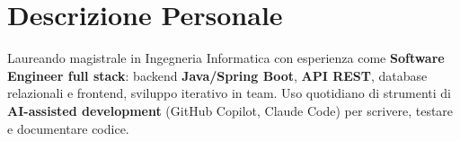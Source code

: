 \section{Descrizione Personale}
{\small Laureando magistrale in Ingegneria Informatica con esperienza come \textbf{Software Engineer full stack}: backend \textbf{Java/Spring Boot}, \textbf{API REST}, database relazionali e frontend, sviluppo iterativo in team. Uso quotidiano di strumenti di \textbf{AI-assisted development} (GitHub Copilot, Claude Code) per scrivere, testare e documentare codice.\par}
\vspace{4pt}
